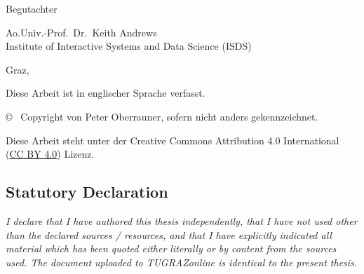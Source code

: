 \begin{otherlanguage}{austrian}
\begin{center}
        {\small\sffamily Begutachter}

        \vspace{5mm}

        {\normalsize\sffamily
            Ao.Univ.-Prof.\ Dr.\ Keith Andrews \\
            Institute of Interactive Systems and Data Science (ISDS)
        }


        \vspace{1cm}

        {\normalsize\sffamily Graz, \thisdate}


        \vspace{1cm}

        {\small Diese Arbeit ist in englischer Sprache verfasst.}



        \vfill

        {\footnotesize\sffamily \copyright ~ Copyright \thisyear von Peter Oberrauner, sofern
            nicht anders gekennzeichnet.}

        {\footnotesize\sffamily Diese Arbeit steht unter der Creative Commons
            Attribution 4.0 International
            (\href{https://creativecommons.org/licenses/by/4.0/}{CC BY 4.0})
            Lizenz.}

    \end{center}

\end{otherlanguage}







\cleardoublepage

\vspace*{2cm}







\subsection*{Statutory Declaration}
\noindent
\textit{
    I declare that I have authored this thesis independently, that I have
    not used other than the declared sources / resources, and that I have
    explicitly indicated all material which has been quoted either
    literally or by content from the sources used. The document uploaded
    to TUGRAZonline is identical to the present thesis.}

